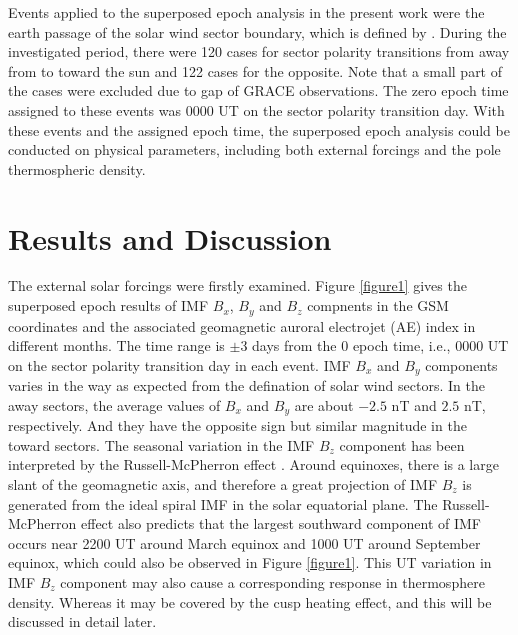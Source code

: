 \documentclass[draft, grl]{/home/guod/Documents/template/agu_template/AGUTeX}
\begin{document}
\begin{article}
    Events applied to the superposed epoch analysis in the present work were 
    the earth passage of the solar wind sector boundary, which is defined by 
    \citet{Svalgaard1976}.
    During the investigated period, there were 120 cases for sector polarity 
    transitions from away from to toward the sun and 122 cases for the opposite.
    Note that a small part of the cases were excluded due to gap of GRACE 
    observations.
    The zero epoch time assigned to these events was 0000 UT on the sector 
    polarity transition day.
    With these events and the assigned epoch time, the superposed epoch analysis
    could be conducted on physical parameters, including both external forcings 
    and the pole thermospheric density.

\section{Results and Discussion}
    The external solar forcings were firstly examined.
    Figure \ref{figure1} gives the superposed epoch results of IMF $B_x$, $B_y$
    and $B_z$ compnents in the GSM coordinates and the associated geomagnetic 
    auroral electrojet (AE) index in different months. 
    The time range is $\pm3$ days from the 0 epoch time, i.e., 0000 UT on the 
    sector polarity transition day in each event.
    IMF $B_x$ and $B_y$ components varies in the way as expected from the 
    defination of solar wind sectors.
    In the away sectors, the average values of $B_x$ and $B_y$ are about $-2.5$
    nT and $2.5$ nT, respectively.
    And they have the opposite sign but similar magnitude in the toward sectors.
    The seasonal variation in the IMF $B_z$ component has been interpreted by 
    the Russell-McPherron effect \citep{Russell1973}.
    Around equinoxes, there is a large slant of the geomagnetic axis, and 
    therefore a great projection of IMF $B_z$ is generated from the ideal spiral
    IMF in the solar equatorial plane.
    The Russell-McPherron effect also predicts that the largest southward 
    component of IMF occurs near 2200 UT around March equinox and 1000 UT around
    September equinox, which could also be observed in Figure \ref{figure1}.
    This UT variation in IMF $B_z$ component may also cause a corresponding 
    response in thermosphere density.
    Whereas it may be covered by the cusp heating effect, and this will be 
    discussed in detail later.
    

\end{article}
\end{document}
